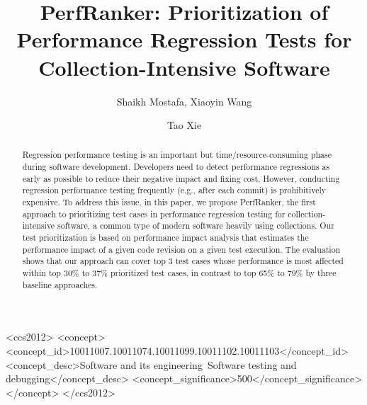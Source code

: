 \documentclass[sigconf]{acmart}
\begin{document}
\title{PerfRanker: Prioritization of Performance Regression Tests for\\ Collection-Intensive Software}

\author{Shaikh Mostafa, Xiaoyin Wang}


\author{Tao Xie}


\begin{abstract}
Regression performance testing is an important but time/resource-consuming phase during software development. Developers need to detect performance regressions as early as possible to reduce their negative impact and fixing cost. However, conducting regression performance testing frequently (e.g., after each commit) is prohibitively expensive. To address this issue, in this paper, we propose PerfRanker, the first approach to prioritizing test cases in performance regression testing for collection-intensive software, a common type of modern software heavily using collections. Our test prioritization is based on performance impact analysis that estimates the performance impact of a given code revision on a given test execution. The evaluation shows that our approach can cover top 3 test cases whose performance is most affected within top 30\% to 37\% prioritized test cases, in contrast to top 65\% to 79\% by three baseline approaches. 

\end{abstract}

\begin{CCSXML}
	<ccs2012>
    <concept>
	<concept_id>10011007.10011074.10011099.10011102.10011103</concept_id>
	<concept_desc>Software and its engineering~Software testing and debugging</concept_desc>
	<concept_significance>500</concept_significance>
	</concept>
	</ccs2012>
\end{CCSXML}


\end{document}
